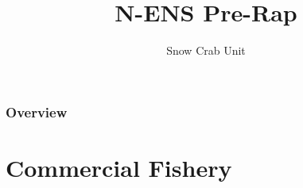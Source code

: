 \documentclass{beamer}
\title[Science / Industry Pre-Rap]{N-ENS Pre-Rap} %
\author{Snow Crab Unit} %
\institute[DFO] %
{
Department of Fisheries and Oceans \\ %
\medskip
\textit{} %
}
\date{\the\year} %
\begin{document}
\begin{frame}
\titlepage %
\end{frame}

\begin{frame}
\frametitle{Overview} %
\tableofcontents%
\end{frame}



\section{Commercial Fishery}
\end{document}
